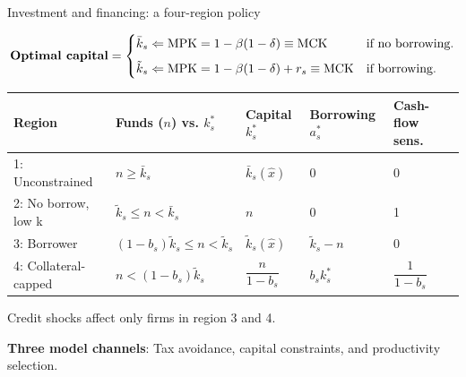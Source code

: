 \documentclass[aspectratio=169]{beamer}
\begin{document}

\begin{frame}{Investment and financing: a four-region policy}

\[
\text{\textbf{Optimal capital}} =
\begin{cases}
    \bar{k}_{s}
    \Leftarrow \mathrm{MPK}
    = 1-\beta(1-\delta) \equiv \mathrm{MCK}
    & \text{if no borrowing.} \\[6pt]
    \tilde{k}_{s}
    \Leftarrow \mathrm{MPK}
    = 1-\beta(1-\delta)+r_s \equiv \mathrm{MCK}
    & \text{if borrowing.}
\end{cases}
\]

\vspace{3mm}

\begin{center}
    \renewcommand{\arraystretch}{1.25}\small
    \begin{tabular}{lllll}
        \toprule
         Region & Funds ($n$) vs. $k^{*}_{s}$ & Capital $k^{*}_{s}$ &
         Borrowing $a^{*}_{s}$ & Cash-flow sens.\ \\
        \midrule
        1: Unconstrained & $n\geq\bar k_{s}$ & $\bar k_{s}(\hat{x})$
         & 0 & 0 \\
        2: No borrow, low k & $\tilde k_{s}\leq n<\bar k_{s}$ &
         $n$ & 0 & 1 \\
        3: Borrower & $(1-b_{s})\tilde k_{s}\leq n
         <\tilde k_{s}$ & $\tilde k_{s}(\hat{x})$ & $\tilde k_{s}-n$
         & 0 \\
        4: Collateral-capped & $n<(1-b_{s})\tilde k_{s}$ &
         $\dfrac{n}{1-b_{s}}$ & $b_{s}k^{*}_{s}$ &
         $\dfrac{1}{1-b_{s}}$ \\
        \bottomrule
    \end{tabular}
\end{center}

\vspace{2mm}
\pause

 Credit shocks affect only firms in region 3 and 4.

\vspace{2mm}
\pause

\textbf{Three model channels}: Tax avoidance, capital constraints, and productivity selection.

\end{frame}
 
\end{document}
